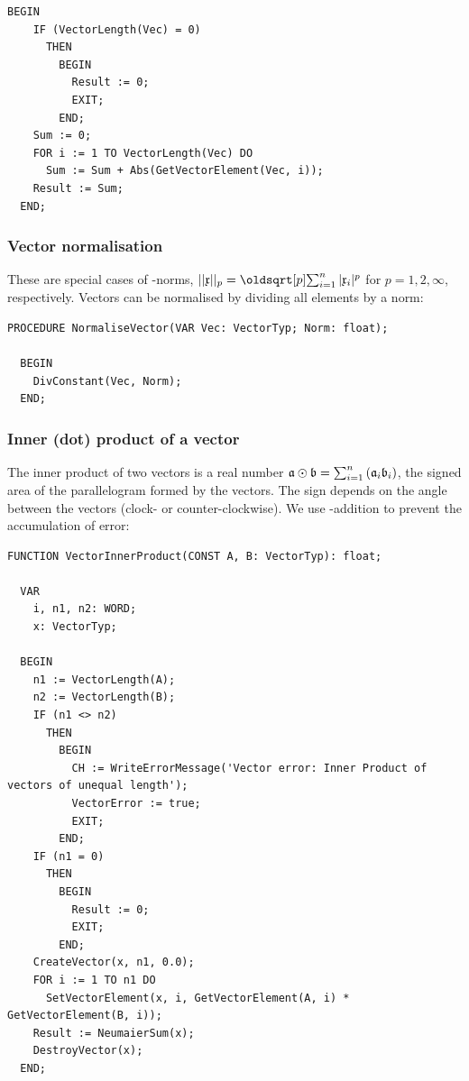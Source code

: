 \begin{refsection}
\begin{lstlisting}[caption=Absolute sum norm]
  BEGIN
    IF (VectorLength(Vec) = 0)
      THEN
        BEGIN
          Result := 0;
          EXIT;
        END;
    Sum := 0;
    FOR i := 1 TO VectorLength(Vec) DO
      Sum := Sum + Abs(GetVectorElement(Vec, i));
    Result := Sum;
  END;
\end{lstlisting}

\subsubsection{Vector normalisation}

These are special cases of -norms, \(||\AbsVec{x}||_p = \sqrt[p]{\sum_{i=1}^n{|\AbsVec{x}_i|^p}} \) for \(p = 1, 2, \infty \), respectively. Vectors can be normalised by dividing all elements by a norm:

\begin{lstlisting}[caption=Normalisation of vector]
  PROCEDURE NormaliseVector(VAR Vec: VectorTyp; Norm: float);

  BEGIN
    DivConstant(Vec, Norm);
  END;
\end{lstlisting}


\subsubsection{Inner (dot) product of a vector}\label{text:dotprod}

The inner product of two vectors  is a real number \(\mathfrak{a} \odot \mathfrak{b} = \sum_{i=1}^n{(\mathfrak{a}_i \mathfrak{b}_i)} \), the signed area of the parallelogram formed by the vectors. The sign depends on the angle between the vectors (clock- or counter-clockwise).  We use -addition to prevent the accumulation of error:

\begin{lstlisting}[caption=Inner product of vectors]
  FUNCTION VectorInnerProduct(CONST A, B: VectorTyp): float;

  VAR
    i, n1, n2: WORD;
    x: VectorTyp;

  BEGIN
    n1 := VectorLength(A);
    n2 := VectorLength(B);
    IF (n1 <> n2)
      THEN
        BEGIN
          CH := WriteErrorMessage('Vector error: Inner Product of vectors of unequal length');
          VectorError := true;
          EXIT;
        END;
    IF (n1 = 0)
      THEN
        BEGIN
          Result := 0;
          EXIT;
        END;
    CreateVector(x, n1, 0.0);
    FOR i := 1 TO n1 DO
      SetVectorElement(x, i, GetVectorElement(A, i) * GetVectorElement(B, i));
    Result := NeumaierSum(x);
    DestroyVector(x);
  END;
\end{lstlisting}


\end{refsection}
